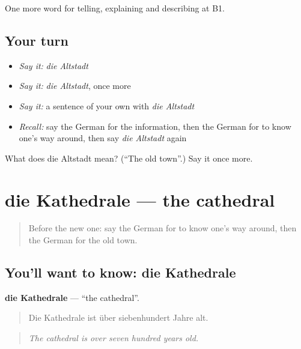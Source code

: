 \begin{grammarlens}[title={What you've built}]
One more word for telling, explaining and describing at B1.
\end{grammarlens}

\subsection*{Your turn}
\begin{itemize}
\raggedright
  \item \emph{Say it:} \emph{die Altstadt}
  \item \emph{Say it:} \emph{die Altstadt}, once more
  \item \emph{Say it:} a sentence of your own with \emph{die Altstadt}
  \item \emph{Recall:} say the German for the information, then the German for to know one's way around, then say \emph{die Altstadt} again
\end{itemize}

\begin{tcolorbox}[breakable,colback=teal!4,colframe=teal!35!black,title={Before you move on}]
What does die Altstadt mean? (\textquotedblleft{}The old town\textquotedblright{}.) Say it once more.
\end{tcolorbox}
\section[die Kathedrale]{die Kathedrale — the cathedral}

\label{lesson:GE-C438-kathedrale}



\begin{quote}
Before the new one: say the German for to know one's way around, then the German for the old town.
\end{quote}

\subsection*{You'll want to know: die Kathedrale}
\textbf{die Kathedrale} — \textquotedblleft{}the cathedral\textquotedblright{}.

\begin{quote}
Die Kathedrale ist über siebenhundert Jahre alt.
\end{quote}

\begin{quote}
\emph{The cathedral is over seven hundred years old.}
\end{quote}

